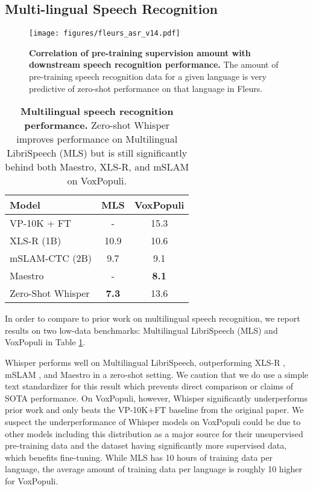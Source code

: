\documentclass[nohyperref]{article}
\theoremstyle{plain}
\theoremstyle{definition}
\theoremstyle{remark}
\begin{document}
\subsection{Multi-lingual Speech Recognition}\label{subsec:multi-lingual}

\begin{figure}[t]
\begin{center}
\centerline{\texttt{[image: figures/fleurs\_asr\_v14.pdf]}}
\caption{\textbf{Correlation of pre-training supervision amount with downstream speech recognition performance.} The amount of pre-training speech recognition data for a given language is very predictive of zero-shot performance on that language in Fleurs.}
\label{fleurs_asr_transfer}
\end{center}
\vspace{-1em}
\end{figure}

\begin{table}[t]
\vskip 0.15in
\begin{center}
\begin{tabular}{l|cc}
\toprule
Model & MLS & VoxPopuli \\
\midrule
VP-10K + FT & - & 15.3 \\
XLS-R (1B) & 10.9 & 10.6 \\
mSLAM-CTC (2B) & 9.7 & 9.1 \\
Maestro & - & \textbf{8.1} \\
\midrule
Zero-Shot Whisper & \textbf{7.3} & 13.6 \\
\bottomrule
\end{tabular}
\caption{\textbf{Multilingual speech recognition performance.} Zero-shot Whisper improves performance on Multilingual LibriSpeech (MLS) but is still significantly behind both Maestro, XLS-R, and mSLAM on VoxPopuli.}
\label{multilingual_table}
\end{center}
\vspace{-1em}
\end{table}

In order to compare to prior work on multilingual speech recognition, we report results on two low-data benchmarks: Multilingual LibriSpeech (MLS) \cite{pratap2020mls} and VoxPopuli \cite{wang2021voxpopuli} in Table \ref{multilingual_table}.

Whisper performs well on Multilingual LibriSpeech, outperforming XLS-R \cite{babu2021xlsr}, mSLAM \cite{bapna2022mslam}, and Maestro \cite{chen2022maestro} in a zero-shot setting. We caution that we do use a simple text standardizer for this result which prevents direct comparison or claims of SOTA performance. On VoxPopuli, however, Whisper significantly underperforms prior work and only beats the VP-10K+FT baseline from the original paper. We suspect the underperformance of Whisper models on VoxPopuli could be due to other models including this distribution as a major source for their unsupervised pre-training data and the dataset having significantly more supervised data, which benefits fine-tuning. While MLS has 10 hours of training data per language, the average amount of training data per language is roughly 10 higher for VoxPopuli.
\end{document}

